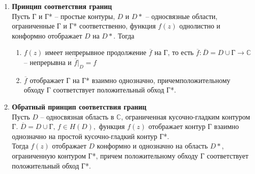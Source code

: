 \begin{enumerate}
\item \textbf{Принцип соответствия границ}\\
Пусть Г и Г* -- простые контуры, $D$ и $D \ast$ -- односвязные области, ограниченные Г и Г* соответственно, функция $f(z)$ однолистно и конформно отображает $D$ на $D \ast$. Тогда 
\begin{enumerate}
    \item $f(z)$ имеет непрерывное продолжение $\overline{f}$ на Г, то есть $\overline{f}: \overline{D}=D \cup \textrm{Г} \rightarrow \mathbb{C}$ -- непрерывна и $\overline{f}|_D=f$
    \item $\overline{f}$ отображает Г на Г* взаимно однозначно, причемположительному обходу Г соответствует положительный обход Г*.\\[2mm]
\end{enumerate}

\item \textbf{Обратный принцип соответствия границ}\\
Пусть $D$ -- односвязная область в $\mathbb{C}$, ограниченная кусочно-гладким контуром Г. $\overline{D}=D \cup \textrm{Г}, \, f \in H(D),$ функция $f(z)$ отображает контур Г взаимно однозначно на простой кусочно-гладкий контур Г*.\\
Тогда $f(z)$ отображает $D$ конформно и однозначно на область $D \ast$, ограниченную контуром Г*, причем положительному обходу Г соответствует положительный обход Г*.


\end{enumerate}